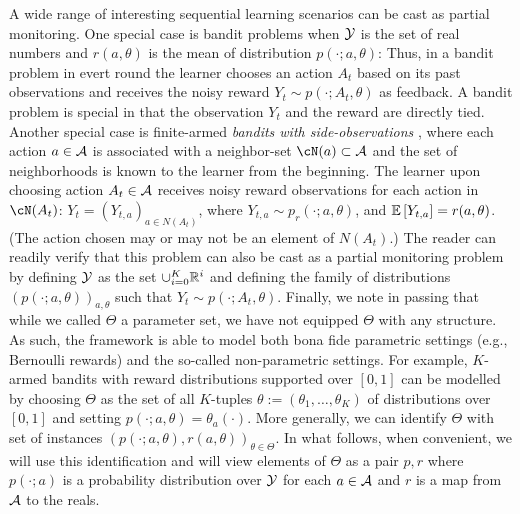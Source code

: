 A wide range of interesting sequential learning scenarios can be cast as partial monitoring.
One special case is bandit problems when $\mathcal{Y}$ is the set of real numbers and $r(a,\theta)$
is the mean of distribution $p(\cdot;a,\theta)$: 
Thus, in a bandit problem in evert round the learner chooses an action $A_t$ based on its past observations
and receives the noisy reward $Y_t \sim p(\cdot;A_t,\theta)$ as feedback. 
A bandit problem is special in that the observation $Y_t$ and the reward are directly tied.
Another special case is finite-armed  \emph{bandits with side-observations} \cite{MaSh11},
where each action $a\in \mathcal{A}$ is associated with a neighbor-set $\cN(a)\subset \A$ and
the set of neighborhoods is known to the learner from the beginning.
The learner upon choosing action $A_t\in \mathcal{A}$ receives noisy reward observations for each action in $\cN(A_t)$:
$Y_t  = (Y_{t,a})_{a\in N(A_t)}$, where $Y_{t,a} \sim p_r(\cdot;a,\theta)$, and $\mathbb{E}\left[Y_{t,a}\right] = r(a,\theta)$.
(The action chosen may or may not be an element of $N(A_t)$.)
The reader can readily verify that this problem can also be cast as a partial monitoring problem
by defining $\mathcal{Y}$ as the set $\cup_{i=0}^K \mathbb{R}^i$ and defining 
the family of distributions $(p(\cdot;a,\theta))_{a,\theta}$ such that $Y_t \sim p(\cdot;A_t,\theta)$.
Finally, we note in passing that while we called $\Theta$ a parameter set, 
we have not equipped $\Theta$ with any structure. As such,
the framework is able to model both bona fide parametric settings (e.g., Bernoulli rewards) and 
the so-called non-parametric settings. For example, $K$-armed bandits with reward distributions supported
over $[0,1]$ can be modelled by choosing $\Theta$ as the set of all $K$-tuples 
$\theta:=(\theta_1,\dots,\theta_K)$ of distributions over $[0,1]$ and setting $p(\cdot;a,\theta) = \theta_a(\cdot)$.
More generally, we can identify $\Theta$ with set of instances $(p(\cdot;a,\theta),r(a,\theta))_{\theta\in \Theta}$.
In what follows, when convenient, we will use this identification and will view elements of $\Theta$ as a pair $p,r$ 
where $p(\cdot;a)$ is a probability distribution over $\mathcal{Y}$ for each $a\in \mathcal{A}$ and $r$ is a map from $\mathcal{A}$ to the reals.
